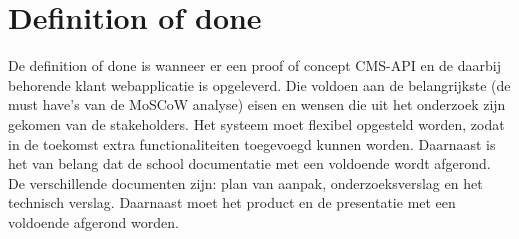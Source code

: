 \section{Definition of done}
De definition of done is wanneer er een proof of concept \gls{CMS}-API en de daarbij behorende klant webapplicatie is opgeleverd. 
Die voldoen aan de belangrijkste (de must have’s van de MoSCoW analyse) eisen en wensen die uit het onderzoek zijn gekomen van de stakeholders.
Het systeem moet flexibel opgesteld worden, zodat in de toekomst extra functionaliteiten toegevoegd kunnen worden.
Daarnaast is het van belang dat de school documentatie met een voldoende wordt afgerond.
De verschillende documenten zijn: plan van aanpak, onderzoeksverslag en het technisch verslag.
Daarnaast moet het product en de presentatie met een voldoende afgerond worden.

